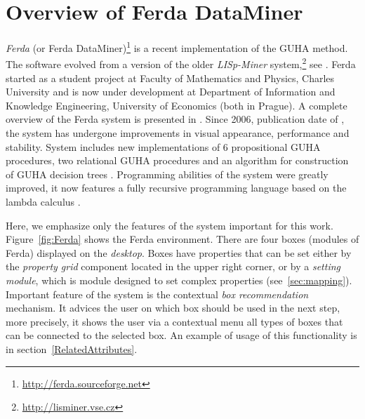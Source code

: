 \section{Overview of Ferda DataMiner} \label{Ferda}

\emph{Ferda} (or Ferda DataMiner)\footnote{\url{http://ferda.sourceforge.net}} is a recent implementation of the GUHA method. 
The software evolved from a version of the older \emph{LISp-Miner} system,\footnote{\url{http://lisminer.vse.cz}} see \cite{Simunek}. Ferda started as a student project at Faculty of Mathematics and Physics, Charles University and is now under development at Department of Information and Knowledge Engineering, University of Economics (both in Prague). 
A complete overview of the Ferda system is presented in \cite{Ferda}. Since 2006, publication date of \cite{Ferda}, the system has undergone improvements in visual appearance, performance and stability. System includes new implementations of 6 propositional GUHA procedures\cite{Disjunctions}, two relational GUHA procedures \cite{Kuzmin} and an algorithm for construction of GUHA decision trees \cite{ETree}. Programming abilities of the system were greatly improved, it now features a fully recursive programming language based on the lambda calculus \cite{Kovac}.

Here, we emphasize only the features of the system important for this work. Figure~\ref{fig:Ferda} shows the Ferda environment. 
There are four boxes (modules of Ferda) displayed on the \emph{desktop}. Boxes have properties that can be set either by the \emph{property grid} component located in the upper right corner, or by a \emph{setting module}, which is module designed to set complex properties (see~\ref{sec:mapping}). Important feature of the system is the contextual \emph{box recommendation} mechanism. It advices the user on which box should be used in the next step, more precisely, it shows the user via a contextual menu all types of boxes that can be connected to the selected box. An example of usage of this functionality is in section~\ref{RelatedAttributes}. 



